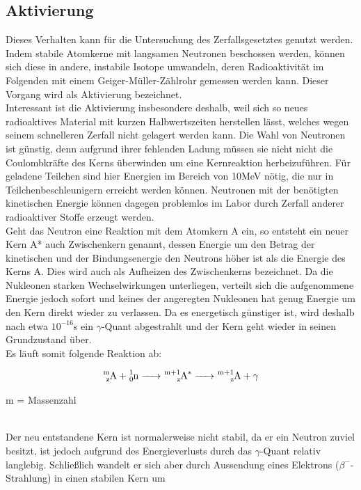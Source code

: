 	\subsection{Aktivierung}
Dieses Verhalten kann für die Untersuchung des Zerfallsgesetztes genutzt werden.
Indem stabile Atomkerne mit langsamen Neutronen beschossen werden, können sich diese in andere, instabile Isotope umwandeln, deren Radioaktivität im Folgenden mit einem Geiger-Müller-Zählrohr gemessen werden kann. Dieser Vorgang wird als Aktivierung bezeichnet.\\
Interessant ist die Aktivierung insbesondere deshalb, weil sich so neues radioaktives Material mit kurzen Halbwertszeiten herstellen lässt, welches wegen seinem schnelleren Zerfall nicht gelagert werden kann.
Die Wahl von Neutronen ist günstig, denn aufgrund ihrer fehlenden Ladung müssen sie nicht nicht die Coulombkräfte des Kerns überwinden um eine Kernreaktion herbeizuführen. Für geladene Teilchen sind hier Energien im Bereich von 10MeV nötig, die nur in Teilchenbeschleunigern erreicht werden können. Neutronen mit der benötigten kinetischen Energie können dagegen problemlos im Labor durch Zerfall anderer radioaktiver Stoffe erzeugt werden.\\
Geht das Neutron eine Reaktion mit dem Atomkern A ein, so entsteht ein neuer Kern A* auch Zwischenkern genannt, dessen Energie um den Betrag der kinetischen und der Bindungsenergie den Neutrons höher ist als die Energie des Kerns A. Dies wird auch als Aufheizen des Zwischenkerns bezeichnet. Da die Nukleonen starken Wechselwirkungen unterliegen, verteilt sich die aufgenommene Energie jedoch sofort und keines der angeregten Nukleonen hat genug Energie um den Kern direkt wieder zu verlassen. Da es energetisch günstiger ist, wird deshalb nach etwa $10^{-16}$s ein $\gamma$-Quant abgestrahlt und der Kern geht wieder in seinen Grundzustand über.\\
Es läuft somit folgende Reaktion ab:
\begin{formel}
\begin{equation}
	{\ce{^m_z A + ^1_0 n -> ^{m+1}_z A^* -> ^{m+1}_z A +\gamma}} 
\end{equation}
\caption*{m = Massenzahl}
\end{formel}
\\
Der neu entstandene Kern ist normalerweise nicht stabil, da er ein Neutron zuviel besitzt, ist jedoch aufgrund des Energieverlusts durch das $\gamma$-Quant relativ langlebig. Schließlich wandelt er sich aber durch Aussendung eines Elektrons ($\beta^-$-Strahlung) in einen stabilen Kern um

